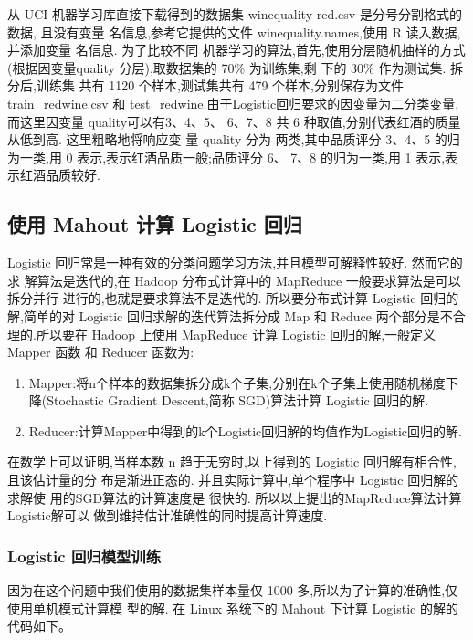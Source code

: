 从 UCI 机器学习库直接下载得到的数据集 winequality-red.csv
是分号分割格式的数据, 且没有变量 名信息,参考它提供的文件
winequality.names,使用 R 读入数据,并添加变量 名信息. 为了比较不同
机器学习的算法,首先,使用分层随机抽样的方式(根据因变量quality
分层),取数据集的 70\% 为训练集,剩 下的 30\% 作为测试集. 拆分后,训练集
共有 1120 个样本,测试集共有 479 个样本,分别保存为文件 train\_redwine.csv
和 test\_redwine.由于Logistic回归要求的因变量为二分类变量,而这里因变量
quality可以有3、4、5、 6、7、8 共 6 种取值,分别代表红酒的质量从低到高.
这里粗略地将响应变 量 quality 分为 两类,其中品质评分 3、4、5
的归为一类,用 0 表示,表示红酒品质一般;品质评分 6、 7、8 的归为一类,用 1
表示,表示红酒品质较好.

\subsection{使用 Mahout 计算 Logistic
回归}\label{ux4f7fux7528-mahout-ux8ba1ux7b97-logistic-ux56deux5f52}

Logistic 回归常是一种有效的分类问题学习方法,并且模型可解释性较好.
然而它的求 解算法是迭代的,在 Hadoop 分布式计算中的 MapReduce
一般要求算法是可以拆分并行 进行的,也就是要求算法不是迭代的.
所以要分布式计算 Logistic 回归的解,简单的对 Logistic
回归求解的迭代算法拆分成 Map 和 Reduce 两个部分是不合理的.所以要在
Hadoop 上使用 MapReduce 计算 Logistic 回归的解,一般定义 Mapper 函数 和
Reducer 函数为:

\begin{enumerate}
\def\labelenumi{\arabic{enumi}.}
\item
  Mapper:将n个样本的数据集拆分成k个子集,分别在k个子集上使用随机梯度下降(Stochastic
  Gradient Descent,简称 SGD)算法计算 Logistic 回归的解.
\item
  Reducer:计算Mapper中得到的k个Logistic回归解的均值作为Logistic回归的解.
\end{enumerate}

在数学上可以证明,当样本数 n 趋于无穷时,以上得到的 Logistic
回归解有相合性, 且该估计量的分 布是渐进正态的. 并且实际计算中,单个程序中
Logistic 回归解的求解使 用的SGD算法的计算速度是 很快的.
所以以上提出的MapReduce算法计算Logistic解可以
做到维持估计准确性的同时提高计算速度.

\subsubsection{Logistic
回归模型训练}\label{logistic-ux56deux5f52ux6a21ux578bux8badux7ec3}

因为在这个问题中我们使用的数据集样本量仅 1000
多,所以为了计算的准确性,仅使用单机模式计算模 型的解. 在 Linux 系统下的
Mahout 下计算 Logistic 的解的代码如下。

